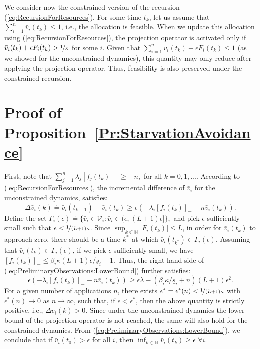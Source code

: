 \documentclass[letter,11pt]{article}
\begin{document}
We consider now the constrained version of the recursion (\ref{eq:RecursionForResources}). For some time $t_k$, let us assume that $\sum_{i=1}^{n}{\bar{v}}_i(t_k)\leq{1}$, i.e., the allocation is feasible. When we update this allocation using (\ref{eq:RecursionForResources}), the projection operator is activated only if ${\bar{v}}_i(t_k)+\epsilon F_i(t_k) >\nicefrac{1}{\kappa}$ for some $i$. Given that $\sum_{i=1}^{n}{\bar{v}}_i(t_k)+\epsilon F_i(t_k) \leq{1}$ (as we showed for the unconstrained dynamics), this quantity may only reduce after applying the projection operator. Thus, feasibility is also preserved under the constrained recursion. 
 
 
\section{Proof of Proposition~\ref{Pr:StarvationAvoidance}} \label{Ap:StarvationAvoidance} 
 
First, note that $\sum_{j=1}^{n}\lambda_j{[{f_j(t_k)}]_{-}} \geq - n,$ for all $k=0,1,...$. 
According to (\ref{eq:RecursionForResources}), the incremental difference of ${\bar{v}}_i$ for the unconstrained dynamics, satisfies:
\begin{equation}	\label{eq:PreliminaryObservations:LowerBound}
\Delta{\bar{v}}_i(k){\doteq} {\bar{v}}_i(t_{k+1}) - {\bar{v}}_i(t_k) 
\geq \epsilon \left( -\lambda_i{[{f_i(t_k)}]_{-}} - n{\bar{v}}_i(t_k) \right).
\end{equation}
Define the set $\Gamma_i(\epsilon){\doteq} \{{\bar{v}}_i\in{\mathcal{V}}_i: {\bar{v}}_i \in (\epsilon,(L+1)\epsilon]\},$ and pick $\epsilon$ sufficiently small such that $\epsilon < \nicefrac{1}{(L+1)\kappa}$. Since $\sup_{k\in\mathbb{N}}{\left\vert {F_i(t_k)} \right\vert}\leq{L}$, in order for ${\bar{v}}_i(t_k)$ to approach zero, there should be a time $k^*$ at which ${\bar{v}}_i(t_{k^*})\in \Gamma_i(\epsilon)$. Assuming that ${\bar{v}}_i(t_k)\in \Gamma_i(\epsilon)$, if we pick $\epsilon$ sufficiently small, we have ${[{f_i(t_k)}]_{-}}\leq \beta_i\kappa(L+1)\epsilon/\underline{s}_i - 1.$ Thus, the right-hand side of (\ref{eq:PreliminaryObservations:LowerBound}) further satisfies:
\begin{equation*}
\epsilon \left( -\lambda_i{[{f_i(t_k)}]_{-}} - n{\bar{v}}_i(t_k) \right) \geq \epsilon\lambda - (\beta_i\kappa/\underline{s}_i + n) (L+1) \epsilon^2.
\end{equation*}
For a given number of applications $n$, there exists $\epsilon^*=\epsilon^*(n)<\nicefrac{1}{(L+1)\kappa}$ with $\epsilon^*(n)\to{0}$ as $n\to\infty$, such that, if $\epsilon < \epsilon^*$, then the above quantity is strictly positive, i.e., $\Delta{\bar{v}}_i(k)>0$. Since under the unconstrained dynamics the lower bound of the projection operator is not reached, the same will also hold for the constrained dynamics. From (\ref{eq:PreliminaryObservations:LowerBound}), we conclude that if ${\bar{v}}_i(t_0) > \epsilon$ for all $i$, then $\inf_{k\in\mathbb{N}}{\bar{v}}_i(t_k) \geq \epsilon$ $\forall{i}$.
\end{document}
